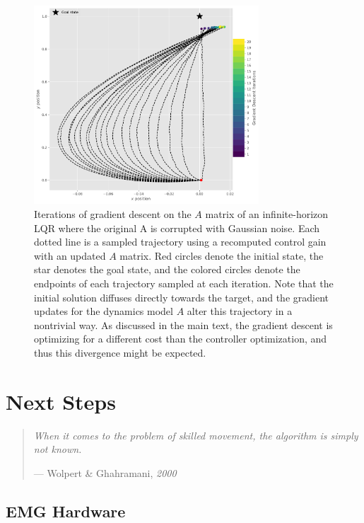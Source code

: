 \documentclass[
  a4paper,
]{article}
\begin{document}
\begin{figure}
\hypertarget{fig:gradient_descent}{%
\centering
\includegraphics[width=0.75\textwidth,height=\textheight]{images/simulations/gradient_descent.pdf}
\caption{Iterations of gradient descent on the \(A\) matrix of an
infinite-horizon LQR where the original A is corrupted with Gaussian
noise. Each dotted line is a sampled trajectory using a recomputed
control gain with an updated \(A\) matrix. Red circles denote the
initial state, the star denotes the goal state, and the colored circles
denote the endpoints of each trajectory sampled at each iteration. Note
that the initial solution diffuses directly towards the target, and the
gradient updates for the dynamics model \(A\) alter this trajectory in a
nontrivial way. As discussed in the main text, the gradient descent is
optimizing for a different cost than the controller optimization, and
thus this divergence might be expected.}\label{fig:gradient_descent}
}
\end{figure}

\clearpage

\hypertarget{sec:next_steps}{%
\section{Next Steps}\label{sec:next_steps}}

\begin{quote}
\emph{When it comes to the problem of skilled movement, the algorithm is
simply not known.}

--- Wolpert \& Ghahramani, \emph{2000}
\end{quote}

\hypertarget{emg-hardware}{%
\subsection{EMG Hardware}\label{emg-hardware}}
\end{document}
